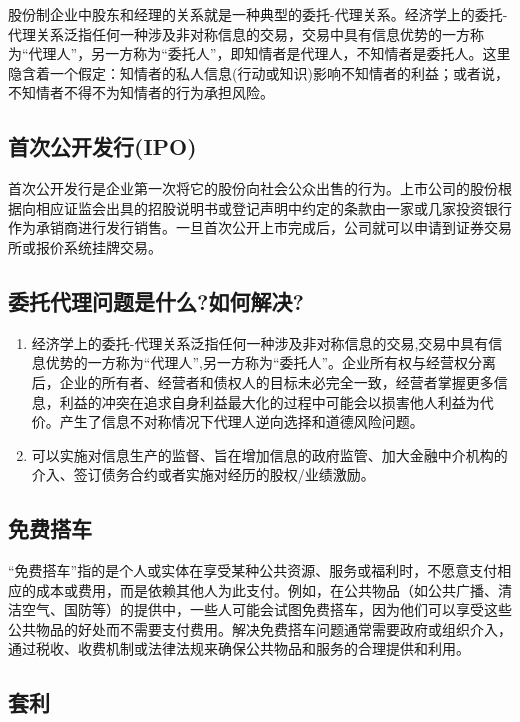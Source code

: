 \documentclass{article}
\begin{document}
股份制企业中股东和经理的关系就是一种典型的委托-代理关系。经济学上的委托-代理关系泛指任何一种涉及非对称信息的交易，交易中具有信息优势的一方称为“代理人”，另一方称为“委托人”，即知情者是代理人，不知情者是委托人。这里隐含着一个假定：知情者的私人信息(行动或知识)影响不知情者的利益；或者说，不知情者不得不为知情者的行为承担风险。

\subsection{首次公开发行(IPO)}

首次公开发行是企业第一次将它的股份向社会公众出售的行为。上市公司的股份根据向相应证监会出具的招股说明书或登记声明中约定的条款由一家或几家投资银行作为承销商进行发行销售。一旦首次公开上市完成后，公司就可以申请到证券交易所或报价系统挂牌交易。

\subsection{委托代理问题是什么?如何解决?}

\begin{enumerate}
	\item 经济学上的委托-代理关系泛指任何一种涉及非对称信息的交易,交易中具有信息优势的一方称为“代理人”,另一方称为“委托人”。企业所有权与经营权分离后，企业的所有者、经营者和债权人的目标未必完全一致，经营者掌握更多信息，利益的冲突在追求自身利益最大化的过程中可能会以损害他人利益为代价。产生了信息不对称情况下代理人逆向选择和道德风险问题。
	\item 可以实施对信息生产的监督、旨在增加信息的政府监管、加大金融中介机构的介入、签订债务合约或者实施对经历的股权/业绩激励。      
\end{enumerate}

\subsection{免费搭车}
	“免费搭车”指的是个人或实体在享受某种公共资源、服务或福利时，不愿意支付相应的成本或费用，而是依赖其他人为此支付。例如，在公共物品（如公共广播、清洁空气、国防等）的提供中，一些人可能会试图免费搭车，因为他们可以享受这些公共物品的好处而不需要支付费用。解决免费搭车问题通常需要政府或组织介入，通过税收、收费机制或法律法规来确保公共物品和服务的合理提供和利用。

\subsection{套利}
\end{document}
